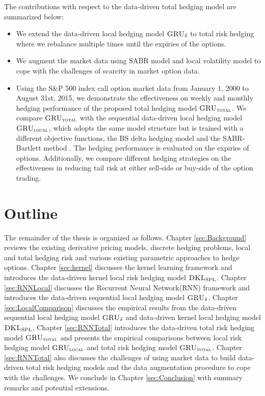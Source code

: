 \documentclass[letterpaper,12pt,titlepage,oneside,final]{book}
\numberwithin{equation}{section}
\theoremstyle{definition}
\newcommand{\model}{\textsc{GRU}_\delta}
\newcommand{\modelT}{\textsc{GRU}_{\textsc{total}}}
\newcommand{\modelL}{\textsc{GRU}_{\textsc{local}}}
\newcommand{\DKLs}{\bf\textsc{DKL}_{\text{SPL}}}
\begin{document}
The contributions with respect to the data-driven total hedging model \cite{knian2020} are summarized below:
\begin{itemize}
	\item  We extend the data-driven local hedging model $\model$ \cite{knian2019} to total risk hedging  where we rebalance multiple times until the expiries of the options.
	\item  We augment the market data using SABR model and local volatility model to cope with the challenges of scarcity in  market option data.
	\item  Using the S\&P 500 index call option market data from January 1, 2000 to  August 31st, 2015, we demonstrate the effectiveness on  weekly and monthly hedging performance of the proposed total hedging model $\modelT$. We compare $\modelT$ with the sequential data-driven local hedging model $\modelL$, which adopts the same model structure but is trained with a different  objective functions, the BS delta hedging model and the SABR-Bartlett method \cite{bartlett2006hedging}. The hedging performance is evaluated on the expiries of  options. Additionally, we compare different hedging strategies on the effectiveness in reducing  tail risk at either sell-side or buy-side of the option trading.

\end{itemize}
\section{Outline}
The remainder of the thesis is organized as follows.
Chapter \ref{sec:Background}  reviews the existing derivative pricing models, discrete hedging problems, local and total hedging risk and various existing parametric approaches to hedge options.
Chapter \ref{sec:kernel}  discusses the kernel learning framework and introduces the data-driven kernel local risk hedging model $\DKLs$. 
Chapter \ref{sec:RNNLocal} discusses the Recurrent Neural Network(RNN) framework and introduces the data-driven sequential local hedging model $\model$.
Chapter \ref{sec:LocalComparison} discusses the  empirical results  from  the data-driven sequential local hedging model $\model$ and data-driven kernel local hedging model $\DKLs$. Chapter \ref{sec:RNNTotal} introduces the data-driven  total risk hedging model $\modelT$ and presents the empirical comparisons between local risk hedging model $\modelL$ and total risk hedging model $\modelT$.
Chapter \ref{sec:RNNTotal}  also discusses the challenges of using market data to build data-driven total risk hedging models and the data augmentation procedure to cope with the challenges.
We conclude in Chapter \ref{sec:Conclusion}  with summary remarks and potential extensions.
\end{document}
